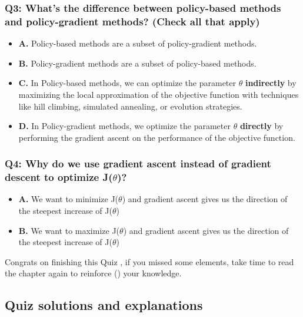 \documentclass[11pt,a4paper]{article}
\begin{document}
\subsubsection{Q3: What's the difference between policy-based methods and policy-gradient methods? (Check all that apply)}\label{q3-whats-the-difference-between-policy-based-methods-and-policy-gradient-methods-check-all-that-apply}

\begin{itemize}
\tightlist
\item
  \textbf{A.} Policy-based methods are a subset of policy-gradient methods.
\item
  \textbf{B.} Policy-gradient methods are a subset of policy-based methods.
\item
  \textbf{C.} In Policy-based methods, we can optimize the parameter \(\theta\) \textbf{indirectly} by maximizing the local approximation of the objective function with techniques like hill climbing, simulated annealing, or evolution strategies.
\item
  \textbf{D.} In Policy-gradient methods, we optimize the parameter \(\theta\) \textbf{directly} by performing the gradient ascent on the performance of the objective function.
\end{itemize}

\subsubsection{\texorpdfstring{Q4: Why do we use gradient ascent instead of gradient descent to optimize J(\(\theta\))?}{Q4: Why do we use gradient ascent instead of gradient descent to optimize J(\textbackslash theta)?}}\label{q4-why-do-we-use-gradient-ascent-instead-of-gradient-descent-to-optimize-jtheta}

\begin{itemize}
\tightlist
\item
  \textbf{A.} We want to minimize J(\(\theta\)) and gradient ascent gives us the direction of the steepest increase of J(\(\theta\))
\item
  \textbf{B.} We want to maximize J(\(\theta\)) and gradient ascent gives us the direction of the steepest increase of J(\(\theta\))
\end{itemize}

Congrats on finishing this Quiz , if you missed some elements, take time to read the chapter again to reinforce () your knowledge.

\subsection{Quiz solutions and explanations}\label{quiz-solutions-and-explanations}
\end{document}
